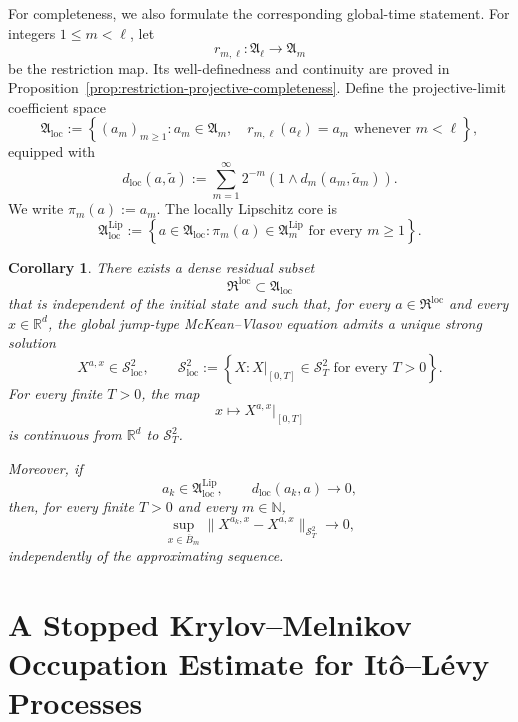 \documentclass[12pt,oneside, reqno]{amsart}
\newtheorem{corollary}[theorem]{Corollary}
\numberwithin{equation}{section}
\begin{document}
	For completeness, we also formulate the corresponding global-time
	statement. For integers $1\leq m<\ell$, let
	\[
	r_{m,\ell}:\mathfrak A_\ell\longrightarrow\mathfrak A_m
	\]
	be the restriction map. Its well-definedness and continuity are proved
	in Proposition~\ref{prop:restriction-projective-completeness}. Define
	the projective-limit coefficient space
	\begin{equation}
		\label{eq:local-coefficient-projective-limit}
		\mathfrak A_{\mathrm{loc}}
		:=
		\left\{
		(a_m)_{m\geq1}:
		a_m\in\mathfrak A_m,\quad
		r_{m,\ell}(a_\ell)=a_m
		\text{ whenever }m<\ell
		\right\},
	\end{equation}
	equipped with
	\begin{equation}
		\label{eq:local-global-metric}
		d_{\mathrm{loc}}(a,\widetilde a)
		:=
		\sum_{m=1}^{\infty}
		2^{-m}
		\left(1\wedge d_m(a_m,\widetilde a_m)\right).
	\end{equation}
	We write $\pi_m(a):=a_m$. The locally Lipschitz core is
	\[
	\mathfrak A_{\mathrm{loc}}^{\mathrm{Lip}}
	:=
	\left\{a\in\mathfrak A_{\mathrm{loc}}:
	\pi_m(a)\in\mathfrak A_m^{\mathrm{Lip}}
	\text{ for every }m\geq1
	\right\}.
	\]
	
	\begin{corollary}
		\label{cor:global-generic-main}
		There exists a dense residual subset
		\[
		\mathfrak R^{\mathrm{loc}}
		\subset
		\mathfrak A_{\mathrm{loc}}
		\]
		that is independent of the initial state and such that, for every
		$a\in\mathfrak R^{\mathrm{loc}}$ and every $x\in\mathbb R^d$, the
		global jump-type McKean--Vlasov equation admits a unique strong
		solution
		\[
		X^{a,x}\in\mathcal S_{\mathrm{loc}}^2,
		\qquad
		\mathcal S_{\mathrm{loc}}^2
		:=
		\left\{X:
		X|_{[0,T]}\in\mathcal S_T^2
		\text{ for every }T>0
		\right\}.
		\]
		For every finite $T>0$, the map
		\[
		x\longmapsto X^{a,x}|_{[0,T]}
		\]
		is continuous from $\mathbb R^d$ to $\mathcal S_T^2$.
		
		Moreover, if
		\[
		a_k\in\mathfrak A_{\mathrm{loc}}^{\mathrm{Lip}},
		\qquad
		d_{\mathrm{loc}}(a_k,a)\longrightarrow0,
		\]
		then, for every finite $T>0$ and every $m\in\mathbb N$,
		\begin{equation}
			\label{eq:global-uniform-initial-state-convergence}
			\sup_{x\in\overline B_m}
			\|X^{a_k,x}-X^{a,x}\|_{\mathcal S_T^2}
			\longrightarrow0,
		\end{equation}
		independently of the approximating sequence.
	\end{corollary}
	
	\section{A Stopped Krylov--Melnikov Occupation Estimate for
		It\^o--L\'evy Processes}
	\label{sec:krylov-ito-levy}
	
\end{document}
